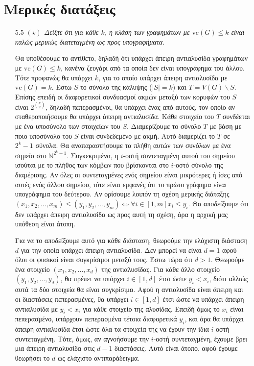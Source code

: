 \documentclass[a4paper, oneside, 11pt]{article}
\theoremstyle{definition}
\newcommand{\vc}{\text{vc}}
\begin{document}
\section{Μερικές διατάξεις}
\begin{enumerate}
	\item[5.5] \emph{$(\star)$ Δείξτε ότι για κάθε $k$, η κλάση των γραφημάτων με $\vc(G)\leq k$ είναι καλώς μερικώς διατεταγμένη ως προς υπογραφήματα.}

Θα υποθέσουμε το αντίθετο, δηλαδή ότι υπάρχει άπειρη αντιαλυσίδα γραφημάτων με $\vc(G)\leq k$, κανένα ζευγάρι από τα οποία δεν είναι υπογράφημα του άλλου. Τότε προφανώς
θα υπάρχει $k$, για το οποίο υπάρχει άπειρη αντιαλυσίδα με $\vc(G)=k$. Έστω $S$ το σύνολο της κάλυψης ($|S|=k$) και $T=V(G) \backslash S$.
Επίσης επειδή οι διαφορετικοί συνδυασμοί ακμών μεταξύ των κορυφών του $S$ είναι $2^{{k\choose 2}}$, 
δηλαδή πεπερασμένοι, θα υπάρχει ένας από αυτούς, τον οποίο αν σταθεροποιήσουμε θα υπάρχει άπειρη αντιαλυσίδα. 
 Κάθε στοιχείο του $T$ συνδέεται με ένα υποσύνολο των στοιχείων
του $S$. Διαμερίζουμε το σύνολο $T$ με βάση με ποιο υποσύνολο του $S$ είναι συνδεδεμένο με ακμή. Αυτό διαμερίζει το $T$ σε $2^k-1$ σύνολα. Θα αναπαραστήσουμε τα πλήθη αυτών των συνόλων με ένα
σημείο στο $\mathbb{N}^{2^k-1}$. Συγκεκριμένα, η $i$-οστή συντεταγμένη αυτού του σημείου ισούται με το πλήθος των κόμβων που βρίσκονται στο $i$-οστό σύνολο της διαμέρισης. Αν όλες οι συντεταγμένες ενός 
σημείου είναι μικρότερες ή ίσες από αυτές ενός άλλου σημείου, τότε είναι εμφανές ότι το πρώτο γράφημα είναι υπογράφημα του δεύτερου. Αν ορίσουμε λοιπόν τη σχέση μερικής διάταξης
$(x_1,x_2,...,x_m) \leq (y_1,y_2,...,y_m) \Leftrightarrow \forall i\in [1,m] x_i \leq y_i$. Θα αποδείξουμε ότι δεν υπάρχει άπειρη αντιαλυσίδα ως προς αυτή τη σχέση, άρα η αρχική μας υπόθεση είναι άτοπη.

Για να το αποδείξουμε αυτό για κάθε διάσταση, θεωρούμε την ελάχιστη διάσταση $d$ για την οποία υπάρχει άπειρη αντιαλυσίδα. Δεν μπορεί να είναι $d=1$ αφού όλοι οι φυσικοί είναι συγκρίσιμοι μεταξύ τους. 
Έστω τώρα ότι $d>1$. Θεωρούμε ένα στοιχείο $(x_1,x_2,...,x_d)$ της αντιαλυσίδας. Για κάθε άλλο στοιχείο $(y_1,y_2,...,y_d)$, θα πρέπει να υπάρχει $i\in [1,d]$ έτσι ώστε $y_i<x_i$, διότι αλλιώς αυτά
τα δύο στοιχεία θα είναι συγκρίσιμα. Αφού η αντιαλυσίδα είναι άπειρη και οι διαστάσεις πεπερασμένες, θα υπάρχει $i\in [1,d]$ έτσι ώστε να υπάρχει άπειρη αντιαλυσίδα με $y_i<x_i$ για κάθε στοιχείο της
αλυσίδας.
Επειδή όμως το $x_i$ είναι πεπερασμένο, υπάρχουν πεπερασμένα τέτοια διαφορετικά $y_i$, και άρα θα υπάρχει άπειρη αντιαλυσίδα έτσι ώστε όλα τα στοιχεία της να έχουν την ίδια $i$-οστή συντεταγμένη.
Τότε, όμως, αν αγνοήσουμε την $i$-οστή συντεταγμένη, έχουμε βρει μια άπειρη αντιαλυσίδα στις $d-1$ διαστάσεις. Αυτό είναι άτοπο, αφού έχουμε θεωρήσει το $d$ ως ελάχιστο αντιπαράδειγμα.



\end{enumerate}
\end{document}
